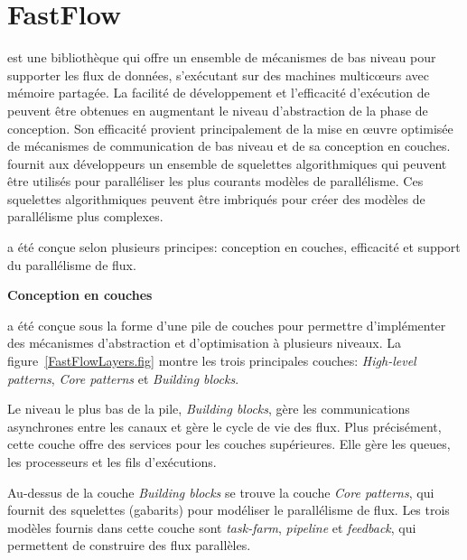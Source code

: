 \section{FastFlow}


 est une biblioth\`eque  qui offre un ensemble de m\'ecanismes de bas niveau pour supporter les flux de donn\'ees, s'ex\'ecutant sur des machines multicœurs avec m\'emoire partag\'ee. La facilit\'e de d\'eveloppement et l'efficacit\'e d'ex\'ecution de  peuvent \^etre obtenues en augmentant le niveau d'abstraction de la phase de conception. Son efficacit\'e provient principalement de la mise en œuvre optimis\'ee de m\'ecanismes de communication de bas niveau et de sa conception en couches.  fournit aux d\'eveloppeurs un ensemble de squelettes algorithmiques qui peuvent \^etre utilis\'es pour parall\'eliser les plus courants mod\`eles de parall\'elisme. Ces squelettes algorithmiques peuvent \^etre imbriqu\'es pour cr\'eer des mod\`eles de parall\'elisme plus complexes.

 a \'et\'e conçue selon plusieurs principes: conception en couches, efficacit\'e et support du parall\'elisme de flux.

\textbf{Conception en couches}


 a \'et\'e conçue sous la forme d'une pile de couches pour permettre d'impl\'ementer des m\'ecanismes d'abstraction et d'optimisation \`a plusieurs niveaux. La figure~\ref{FastFlowLayers.fig} montre les trois principales couches: \emph{High-level patterns}, \emph{Core patterns} et \emph{Building blocks}. 

Le niveau le plus bas de la pile, \emph{Building blocks}, g\`ere les communications asynchrones entre les canaux et g\`ere le cycle de vie des flux. Plus pr\'ecis\'ement, cette couche offre des services pour les couches sup\'erieures. Elle g\`ere les queues, les processeurs et les fils d'ex\'ecutions.

Au-dessus de la couche \emph{Building blocks} se trouve la couche \emph{Core patterns}, qui fournit des squelettes (gabarits) pour mod\'eliser le parall\'elisme de flux. Les trois mod\`eles fournis dans cette couche sont \emph{task-farm}, \emph{pipeline} et \emph{feedback}, qui permettent de construire des flux parall\`eles. 

